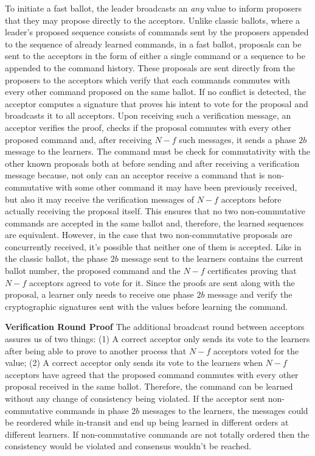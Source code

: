 To initiate a fast ballot, the leader broadcasts an \textit{any} value to inform proposers that they may propose directly to the acceptors. Unlike classic ballots, where a leader's proposed sequence consists of commands sent by the proposers appended to the sequence of already learned commands, in a fast ballot, proposals can be sent to the acceptors in the form of either a single command or a sequence to be appended to the command history. These proposals are sent directly from the proposers to the acceptors which verify that each commands commutes with every other command proposed on the same ballot. If no conflict is detected, the acceptor computes a signature that proves his intent to vote for the proposal and broadcasts it to all acceptors. Upon receiving such a verification message, an acceptor verifies the proof, checks if the proposal commutes with every other proposed command and, after receiving $N-f$ such messages, it sends a phase $2b$ message to the learners. The command must be check for commutativity with the other known proposals both at before sending and after receiving a verification message because, not only can an acceptor receive a command that is non-commutative with some other command it may have been previously received, but also it may receive the verification messages of $N-f$ acceptors before actually receiving the proposal itself. This ensures that no two non-commutative commands are accepted in the same ballot and, therefore, the learned sequences are equivalent. However, in the case that two non-commutative proposals are concurrently received, it's possible that neither one of them is accepted. Like in the classic ballot, the phase $2b$ message sent to the learners contains the current ballot number, the proposed command and the $N-f$ certificates proving that $N-f$ acceptors agreed to vote for it. Since the proofs are sent along with the proposal, a learner only needs to receive one phase $2b$ message and verify the cryptographic signatures sent with the values before learning the command.\par
\textbf{Verification Round Proof} 
The additional broadcast round between acceptors assures us of two things: (1) A correct acceptor only sends its vote to the learners after being able to prove to another process that $N-f$ acceptors voted for the value; (2) A correct acceptor only sends its vote to the learners when $N-f$ acceptors have agreed that the proposed command commutes with every other proposal received in the same ballot. Therefore, the command can be learned without any change of consistency being violated. If the acceptor sent non-commutative commands in phase $2b$ messages to the learners, the messages could be reordered while in-transit and end up being learned in different orders at different learners. If non-commutative commands are not totally ordered then the consistency would be violated and consensus wouldn't be reached. \par
